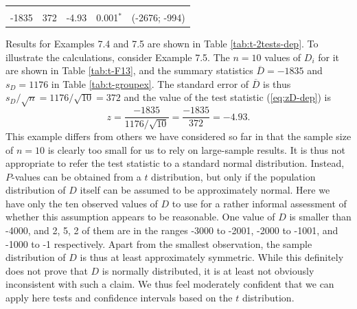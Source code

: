 \documentclass[11pt,a4paper,openany]{book}
\begin{document}
\begin{longtable}[]{@{}rrrrr@{}}
\begin{minipage}[t]{0.29\columnwidth}
\end{minipage} & \begin{minipage}[t]{0.13\columnwidth}\raggedleft\strut
\strut
\end{minipage} & \begin{minipage}[t]{0.18\columnwidth}\raggedleft\strut
\strut
\end{minipage} & \begin{minipage}[t]{0.13\columnwidth}\raggedleft\strut
\strut
\end{minipage} & \begin{minipage}[t]{0.12\columnwidth}\raggedleft\strut
\strut
\end{minipage}\tabularnewline
\begin{minipage}[t]{0.29\columnwidth}\raggedleft\strut
-1835\strut
\end{minipage} & \begin{minipage}[t]{0.13\columnwidth}\raggedleft\strut
372\strut
\end{minipage} & \begin{minipage}[t]{0.18\columnwidth}\raggedleft\strut
-4.93\strut
\end{minipage} & \begin{minipage}[t]{0.13\columnwidth}\raggedleft\strut
0.001\(^{*}\)\strut
\end{minipage} & \begin{minipage}[t]{0.12\columnwidth}\raggedleft\strut
(-2676; -994)\strut
\end{minipage}\tabularnewline
\bottomrule
\end{longtable}

Results for Examples 7.4 and 7.5 are shown in Table
\ref{tab:t-2tests-dep}. To illustrate the calculations, consider Example
7.5. The \(n=10\) values of \(D_{i}\) for it are shown in Table
\ref{tab:t-F13}, and the summary statistics \(\overline{D}=-1835\) and
\(s_{D}=1176\) in Table \ref{tab:t-groupex}. The standard error of
\(\overline{D}\) is thus \(s_{D}/\sqrt{n}=1176/\sqrt{10}=372\) and the
value of the test statistic (\ref{eq:zD-dep}) is
\[z=\frac{-1835}{1176/\sqrt{10}}=\frac{-1835}{372}=-4.93.\] This example
differs from others we have considered so far in that the sample size of
\(n=10\) is clearly too small for us to rely on large-sample results. It
is thus not appropriate to refer the test statistic to a standard normal
distribution. Instead, \(P\)-values can be obtained from a \(t\)
distribution, but only if the population distribution of \(D\) itself
can be assumed to be approximately normal. Here we have only the ten
observed values of \(D\) to use for a rather informal assessment of
whether this assumption appears to be reasonable. One value of \(D\) is
smaller than -4000, and 2, 5, 2 of them are in the ranges -3000 to
-2001, -2000 to -1001, and -1000 to -1 respectively. Apart from the
smallest observation, the sample distribution of \(D\) is thus at least
approximately symmetric. While this definitely does not prove that \(D\)
is normally distributed, it is at least not obviously inconsistent with
such a claim. We thus feel moderately confident that we can apply here
tests and confidence intervals based on the \(t\) distribution.
\end{document}
